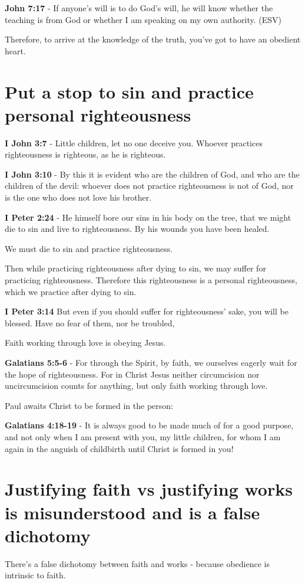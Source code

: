 \documentclass[11pt]{article}
\begin{document}
\textbf{John 7:17} -  If anyone's will is to do God's will, he will know whether the teaching is from God or whether I am speaking on my own authority.  (ESV)

Therefore, to arrive at the knowledge of the truth, you've got to have an obedient heart.

\section{Put a stop to sin and practice personal righteousness}
\label{sec:org6b4c244}
\textbf{I John 3:7} - Little children, let no one deceive you. Whoever practices righteousness is righteous, as he is righteous.

\textbf{I John 3:10} - By this it is evident who are the children of God, and who are the children of the devil: whoever does not practice righteousness is not of God, nor is the one who does not love his brother.

\textbf{I Peter 2:24} - He himself bore our sins in his body on the tree, that we might die to sin and live to righteousness. By his wounds you have been healed.

We must die to sin and practice righteousness.

Then while practicing righteousness after dying to sin, we may suffer for practicing righteousness.
Therefore this righteousness is a personal righteousness, which we practice after dying to sin.

\textbf{I Peter 3:14} But even if you should suffer for righteousness' sake, you will be blessed. Have no fear of them, nor be troubled,

Faith working through love is obeying Jesus.

\textbf{Galatians 5:5-6} - For through the Spirit, by faith, we ourselves eagerly wait for the hope of righteousness. For in Christ Jesus neither circumcision nor uncircumcision counts for anything, but only faith working through love.

Paul awaits Christ to be formed in the person:

\textbf{Galatians 4:18-19} - It is always good to be made much of for a good purpose, and not only when I am present with you, my little children, for whom I am again in the anguish of childbirth until Christ is formed in you!

\section{Justifying faith vs justifying works is misunderstood and is a false dichotomy}
\label{sec:orgcd544cd}
There's a false dichotomy between faith and works - because obedience is intrinsic to faith.
\end{document}
